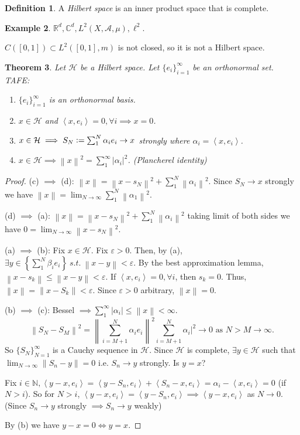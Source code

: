 \documentclass{report}
\newcommand{\R}{\mathbb{R}}
\newcommand{\C}{\mathbb{C}}
\newcommand{\N}{\mathbb{N}}
\newcommand{\st}{\ s.t.\ }
\newcommand{\cA}{\mathcal{A}}
\newcommand{\cH}{\mathcal{H}}
\newcommand{\inner}[2]{\left\langle #1, #2\right\rangle}
\newcommand{\norm}[1]{\left\| #1 \right\|}
\newcommand{\defeq}{\vcentcolon=}
\newtheorem{theorem}{Theorem}[chapter]
\theoremstyle{definition}
\newtheorem{definition}[theorem]{Definition}
\newtheorem{example}[theorem]{Example}
\theoremstyle{remark}
\begin{document}
\begin{definition}
	A \emph{Hilbert space} is an inner product space that is complete.
\end{definition}
\begin{example}
	$\R^d, \C^d, L^2(X, \cA, \mu), \ell^2$.
	
	$C([0, 1]) \subset L^2([0, 1], m)$ is not closed, so it is not a Hilbert space.
\end{example}
\begin{theorem}
	Let $\mathcal{H}$ be a Hilbert space. Let $\{e_i\}_{i=1}^\infty$ be an orthonormal set. TAFE: \begin{enumerate}
		\item $\{e_i\}_{i=1}^\infty$ is an orthonormal basis.
		\item $x \in \cH$ and $\inner{x}{e_i} = 0, \forall i \implies x = 0$.
		\item $x \in \cH \implies S_N \defeq \sum_1^N \alpha_i e_i \to x$ strongly where $\alpha_i = \inner{x}{e_i}$.
		\item $x \in \cH \implies \norm{x}^2 = \sum_1^\infty |\alpha_i|^2$. (Plancherel identity)
	\end{enumerate}
\end{theorem}
\begin{proof}
	(c) $\implies$ (d): $\norm{x} = \norm{x - s_N}^2 + \sum_1^N \norm{\alpha_i}^2$. Since $S_N \to x$ strongly we have $\norm{x} = \lim_{N \to \infty} \sum_1^N \norm{\alpha_1}^2$.

	(d) $\implies$ (a): $\norm{x} = \norm{x - s_N}^2 + \sum_1^N \norm{\alpha_i}^2$ taking limit of both sides we have $0 = \lim_{N \to \infty}\norm{x - s_N}^2$.

	(a) $\implies$ (b): Fix $x \in \cH$. Fix $\varepsilon > 0$. Then, by (a), $\exists y \in \left\{\sum_1^N \beta_i e_i\right\} \st \norm{x - y} < \varepsilon$. By the best approximation lemma, $\norm{x - s_k} \leq \norm{x - y} < \varepsilon$. If $\inner{x}{e_i} = 0, \forall i$, then $s_k = 0$. Thus, $\norm{x} = \norm{x - S_k} < \varepsilon$. Since $\varepsilon > 0$ arbitrary, $\norm{x} = 0$.

	(b) $\implies$ (c): Bessel $\implies \sum_{1}^\infty |\alpha_i| \leq \norm{x} < \infty$. 
	\[\norm{S_N - S_M}^2 = \norm{\sum_{i = M + 1}^N \alpha_i e_i}^2 \sum_{i = M+1}^N \alpha_i|^2 \to 0 \text{ as } N > M \to \infty.\]
	So $\{S_N\}_{N=1}^\infty$ is a Cauchy sequence in $\cH$. Since $\cH$ is complete, $\exists y \in \cH$ such that\\ $\lim_{N \to \infty}\norm{S_n - y} = 0$ i.e. $S_n \to y$ strongly. Is $y = x$?

	Fix $i \in \N, \inner{y - x}{e_i} = \inner{y - S_n}{e_i} + \inner{S_n - x}{e_i} = \alpha_i - \inner{x}{e_i} = 0$ (if $N > i$). So for $N > i$, $\inner{y - x}{e_i} = \inner{y - S_n}{e_i} \implies \inner{y - x}{e_i}$ as $N \to 0$. (Since $S_n \to y$ strongly $\implies S_n \to y$ weakly)

	By (b) we have $y - x = 0 \iff y = x$.
\end{proof}
\end{document}
